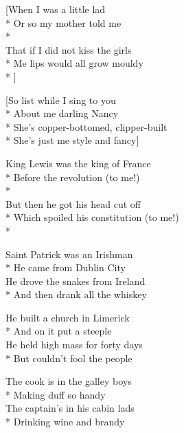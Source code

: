 
[When I was a little lad\\*
Or so my mother told me\\*
\vin{}\\
That if I did not kiss the girls\\*
Me lips would all grow mouldy\\*
\vin{}]


[So list while I sing to you\\*
About me darling Nancy\\*
She’s copper-bottomed, clipper-built\\*
She’s just me style and fancy]

\versemark
King Lewis was the king of France\\*
Before the revolution (to me!)\\*
\vin{}\\
But then he got his head cut off\\*
Which spoiled his constitution (to me!)\\*
\vin{}

\versemark
Saint Patrick was an Irishman\\*
He came from Dublin City\etc\\
He drove the snakes from Ireland\\*
And then drank all the whiskey\etcrefrain

\versemark
He built a church in Limerick\\*
And on it put a steeple\etc\\
He held high mass for forty days\\*
But couldn’t fool the people\etcrefrain

\versemark
The cook is in the galley boys\\*
Making duff so handy\etc\\
The captain’s in his cabin lads\\*
Drinking wine and brandy\etcrefrain

